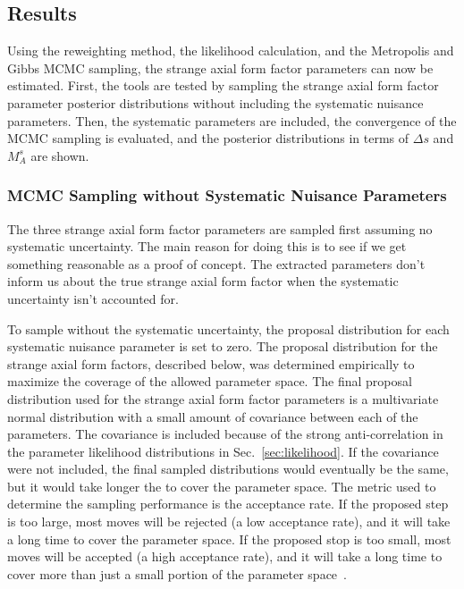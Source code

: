 \subsection{Results}\label{sec:results}
  Using the reweighting method, the likelihood calculation, and the Metropolis
  and Gibbs MCMC sampling, the strange axial form factor parameters can now be
  estimated. First, the tools are tested by sampling the strange axial form
  factor parameter posterior distributions without including the systematic
  nuisance parameters. Then, the systematic parameters are included, the
  convergence of the MCMC sampling is evaluated, and the posterior
  distributions in terms of $\Delta s$ and $M_A^s$ are shown.

  \subsubsection{MCMC Sampling without Systematic Nuisance Parameters}\label{sec:mcmcnosyst}
    The three strange axial form factor parameters are sampled first assuming no
    systematic uncertainty. The main reason for doing this is to see if we get
    something reasonable as a proof of concept. The extracted parameters don't
    inform us about the true strange axial form factor when the systematic
    uncertainty isn't accounted for.
    
    To sample without the systematic uncertainty, the proposal distribution for
    each systematic nuisance parameter is set to zero. The proposal
    distribution for the strange axial form factors, described below, was
    determined empirically to maximize the coverage of the allowed parameter
    space. The final proposal distribution used for the strange axial form
    factor parameters is a multivariate normal distribution with a small amount
    of covariance between each of the parameters. The covariance is included
    because of the strong anti-correlation in the parameter likelihood
    distributions in Sec.~\ref{sec:likelihood}. If the covariance were not
    included, the final sampled distributions would eventually be the same, but
    it would take longer the to cover the parameter space. The metric used to
    determine the sampling performance is the acceptance rate. If the proposed
    step is too large, most moves will be rejected (a low acceptance rate), and
    it will take a long time to cover the parameter space. If the proposed stop
    is too small, most moves will be accepted (a high acceptance rate), and it
    will take a long time to cover more than just a small portion of the
    parameter space~\cite{Brooks:2011}.
    
